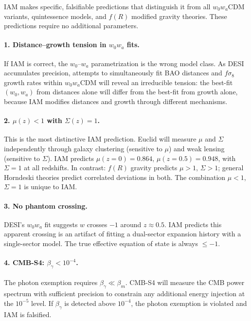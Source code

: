 \documentclass[11pt]{article}
\begin{document}
IAM makes specific, falsifiable predictions that distinguish it from all
$w_0w_a$CDM variants, quintessence models, and $f(R)$ modified gravity
theories.  These predictions require no additional parameters.

\paragraph{1. Distance--growth tension in $w_0w_a$ fits.}
If IAM is correct, the $w_0$--$w_a$ parametrization is the wrong model class.
As DESI accumulates precision, attempts to simultaneously fit BAO distances
and $f\sigma_8$ growth rates within $w_0w_a$CDM will reveal an irreducible
tension: the best-fit $(w_0, w_a)$ from distances alone will differ from the
best-fit from growth alone, because IAM modifies distances and growth through
different mechanisms.

\paragraph{2. $\mu(z) < 1$ with $\Sigma(z) = 1$.}
This is the most distinctive IAM prediction.  Euclid will measure $\mu$ and
$\Sigma$ independently through galaxy clustering (sensitive to $\mu$) and
weak lensing (sensitive to $\Sigma$).  IAM predicts $\mu(z{=}0) = 0.864$,
$\mu(z{=}0.5) = 0.948$, with $\Sigma = 1$ at all redshifts.  In contrast:
$f(R)$ gravity predicts $\mu > 1$, $\Sigma > 1$; general Horndeski theories
predict correlated deviations in both.  The combination $\mu < 1$,
$\Sigma = 1$ is unique to IAM.

\paragraph{3. No phantom crossing.}
DESI's $w_0w_a$ fit suggests $w$ crosses $-1$ around $z \approx 0.5$.  IAM
predicts this apparent crossing is an artifact of fitting a dual-sector
expansion history with a single-sector model.  The true effective equation of
state is always $\leq -1$.

\paragraph{4. CMB-S4: $\beta_\gamma < 10^{-4}$.}
The photon exemption requires $\beta_\gamma \ll \beta_m$.  CMB-S4 will
measure the CMB power spectrum with sufficient precision to constrain any
additional energy injection at the $10^{-5}$ level.  If $\beta_\gamma$ is
detected above $10^{-4}$, the photon exemption is violated and IAM is
falsified.
\end{document}
